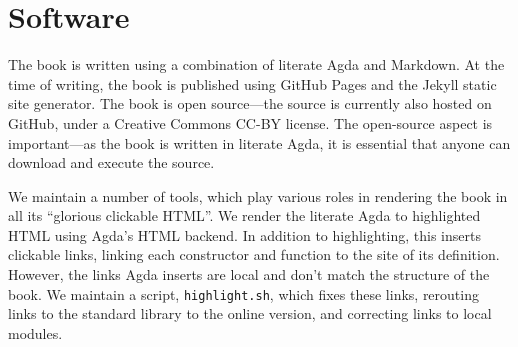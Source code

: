\documentclass[preprint,authoryear]{elsarticle}
\begin{document}


\section{Software}

The book is written using a combination of literate Agda and Markdown.  At the
time of writing, the book is published using GitHub Pages and the Jekyll static
site generator.  The book is open source---the source is currently also hosted
on GitHub, under a Creative Commons CC-BY license.  The open-source aspect is
important---as the book is written in literate Agda, it is essential that anyone
can download and execute the source.

We maintain a number of tools, which play various roles in rendering the book in
all its ``glorious clickable HTML''. We render the literate Agda to highlighted
HTML using Agda's HTML backend. In addition to highlighting, this inserts
clickable links, linking each constructor and function to the site of its
definition.  However, the links Agda inserts are local and don't match the
structure of the book.  We maintain a script, \texttt{highlight.sh}, which fixes
these links, rerouting links to the standard library to the online version, and
correcting links to local modules.
\end{document}
